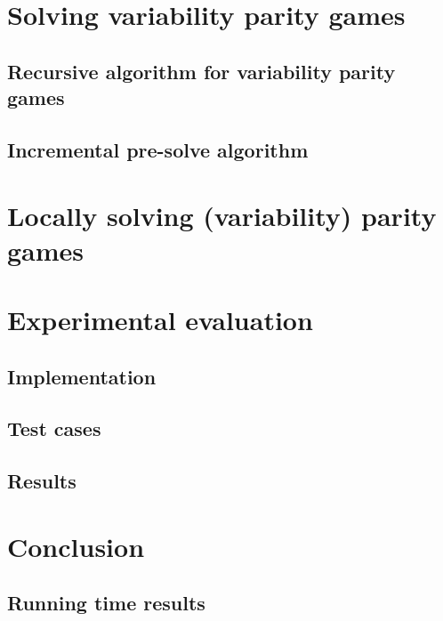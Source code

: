 \documentclass[]{article}
\begin{document}
\pagebreak
\section{Solving variability parity games}


\subsection{Recursive algorithm for variability parity games}


\subsection{Incremental pre-solve algorithm}


\pagebreak
\section{Locally solving (variability) parity games}


\pagebreak
\section{Experimental evaluation}


\subsection{Implementation}


\subsection{Test cases}


\subsection{Results}


\pagebreak
\section{Conclusion}


\pagebreak
\begin{appendices}
\section{Running time results}
\label{appendix:resultsexact}

\end{appendices}

\pagebreak

 
\end{document}
